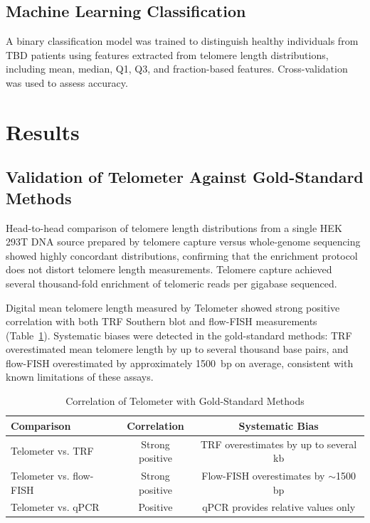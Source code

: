 \documentclass[11pt]{article}
\begin{document}
\subsection{Machine Learning Classification}

A binary classification model was trained to distinguish healthy individuals from TBD patients using features extracted from telomere length distributions, including mean, median, Q1, Q3, and fraction-based features. Cross-validation was used to assess accuracy.

\section{Results}

\subsection{Validation of Telometer Against Gold-Standard Methods}

Head-to-head comparison of telomere length distributions from a single HEK 293T DNA source prepared by telomere capture versus whole-genome sequencing showed highly concordant distributions, confirming that the enrichment protocol does not distort telomere length measurements. Telomere capture achieved several thousand-fold enrichment of telomeric reads per gigabase sequenced.

Digital mean telomere length measured by Telometer showed strong positive correlation with both TRF Southern blot and flow-FISH measurements (Table~\ref{tab:validation}). Systematic biases were detected in the gold-standard methods: TRF overestimated mean telomere length by up to several thousand base pairs, and flow-FISH overestimated by approximately 1500~bp on average, consistent with known limitations of these assays.

\begin{table}[ht]
\centering
\caption{Correlation of Telometer with Gold-Standard Methods}
\label{tab:validation}
\begin{tabular}{lcc}
\toprule
\textbf{Comparison} & \textbf{Correlation} & \textbf{Systematic Bias} \\
\midrule
Telometer vs. TRF & Strong positive & TRF overestimates by up to several kb \\
Telometer vs. flow-FISH & Strong positive & Flow-FISH overestimates by $\sim$1500 bp \\
Telometer vs. qPCR & Positive & qPCR provides relative values only \\
\bottomrule
\end{tabular}
\end{table}
\end{document}
